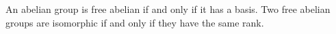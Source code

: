 An abelian group is free abelian if and only if it has a basis. Two free abelian groups are isomorphic if and only if they have the same rank.
